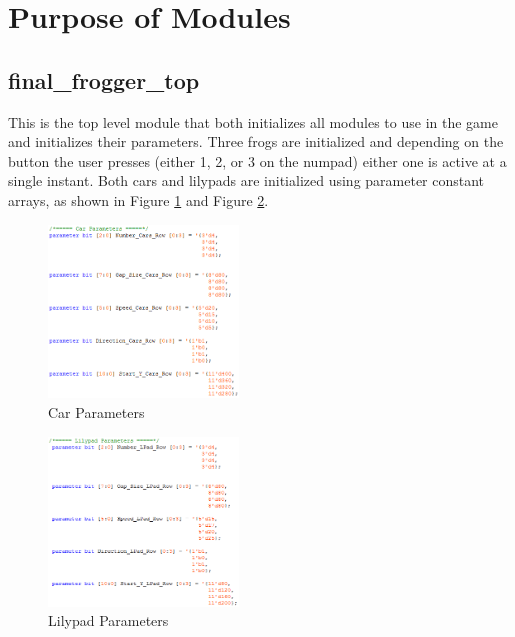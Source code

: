 \documentclass[journal, twocolumn, final,11pt,letterpaper]{IEEEtran}
\begin{document}
 
\section{Purpose of Modules}
	
	\subsection{final\_frogger\_top}
	This is the top level module that both initializes all modules to use in the game and initializes their parameters. Three frogs are initialized and depending on the button the user presses (either 1, 2, or 3 on the numpad) either one is active at a single instant. Both cars and lilypads are initialized using parameter constant arrays, as shown in Figure \ref{fig:car-parameters} and Figure \ref{fig:lilypad-parameters]}. 
	\begin{figure}[H]
		\centering
		\includegraphics[width=0.45\textwidth]{car_parameters.png}
		\caption{Car Parameters}
		\label{fig:car-parameters}
	\end{figure}
	
	\begin{figure}[H]
		\centering
		\includegraphics[width=0.45\textwidth]{lilypad_parameters.png}
		\caption{Lilypad Parameters}
		\label{fig:lilypad-parameters]}
	\end{figure}
	
\end{document}
